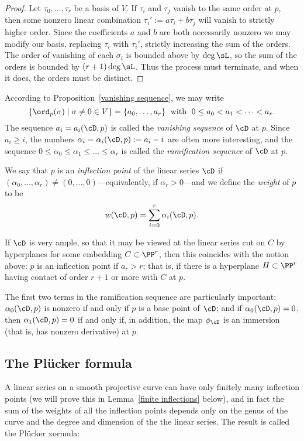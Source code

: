 \begin{proof} Let $\tau_0, \dots, \tau_r$ be a basis of $V$.  If  $\tau_i$ and $\tau_j$ vanish to the same order at $p$, then 
some nonzero linear combination $\tau_i' := a\tau_i+b\tau_j$  will vanish to strictly higher order. Since the coefficients $a$ and $b$ are both necessarily nonzero we may modify our basis, replacing $\tau_i$ with $\tau_i'$, strictly increasing the sum of the orders. 
The order of vanishing of each $\sigma_i$ is bounded above by $\deg \sL$, so the sum of the orders is bounded by $(r+1)\deg \sL$. Thus the process must terminate, and when it does,
 the orders must be distinct. \end{proof}

According to  Proposition~\ref{vanishing sequence}, we may write
$$
\{ \ord_p(\sigma) \mid \sigma \neq 0 \in V \} = \{a_0,\dots,a_r\} \; \text{ with } \; 0\leq a_0 < a_1 < \dots < a_r.
$$
The sequence $a_i = a_i(\cD,p)$ is called the \emph{vanishing sequence} of $\cD$ at $p$.  Since $a_i \geq i$, the numbers $\alpha_i = \alpha_i(\cD,p) := a_i - i$ are often more interesting, and the sequence $0 \leq \alpha_0 \leq \alpha_1 \leq \dots \leq \alpha_r$ is called the \emph{ramification sequence} of $\cD$ at $p$. 

We say that $p$ is an \emph{inflection point} of the linear series $\cD$ if $(\alpha_0,\dots,\alpha_r) \neq (0,\dots,0)$---equivalently, if $\alpha_r > 0$---and we define the \emph{weight} of $p$ to be
$$
w(\cD, p) = \sum_{i=0}^r \alpha_i(\cD, p).
$$

If $\cD$ is very ample, so that it may be viewed at the linear series cut on $C$ by hyperplanes for some embedding $C \subset \PP^r$, then this coincides with the notion above: $p$ is an inflection point if $a_r > r$; that is, if there is a hyperplane $H \subset \PP^r$ having contact of order $r+1$ or more with $C$ at $p$.

The first two terms in the ramification sequence are particularly important: $\alpha_0(\cD, p)$ is nonzero if and only if $p$ is a base point of $\cD$; and if $\alpha_0(\cD, p)=0$, then $\alpha_1(\cD, p) = 0$ if and only if, in addition, the map $\phi_\cD$ is an immersion (that is, has nonzero derivative) at $p$.


\subsection{The Pl\"ucker formula}

A linear series on a smooth projective curve can have only finitely many inflection points (we will prove this in Lemma~\ref{finite inflections} below), and in fact the sum of the weights of all the inflection points depends only on the genus of the curve and the degree and dimension of the the linear series. The result is called the Pl\"ucker xormula:

